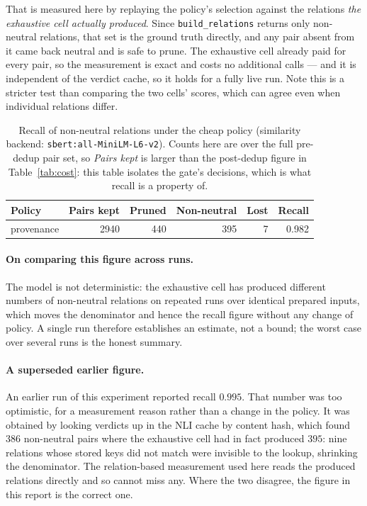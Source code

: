 \documentclass[11pt]{article}
\begin{document}
That is measured here by replaying the policy's selection against the relations \emph{the exhaustive cell actually produced}. Since \texttt{build\_relations} returns only non-neutral relations, that set is the ground truth directly, and any pair absent from it came back neutral and is safe to prune. The exhaustive cell already paid for every pair, so the measurement is exact and costs no additional calls --- and it is independent of the verdict cache, so it holds for a fully live run. Note this is a stricter test than comparing the two cells' scores, which can agree even when individual relations differ.

\begin{table}[htbp]
\centering
\begin{tabular}{lrrrrr}
\toprule
Policy & Pairs kept & Pruned & Non-neutral & Lost & Recall \\
\midrule
provenance & 2940 & 440 & 395 & 7 & 0.982 \\
\bottomrule
\end{tabular}
\caption{Recall of non-neutral relations under the cheap policy (similarity backend: \texttt{sbert:all-MiniLM-L6-v2}). Counts here are over the full pre-dedup pair set, so \emph{Pairs kept} is larger than the post-dedup figure in Table~\ref{tab:cost}: this table isolates the gate's decisions, which is what recall is a property of.}
\label{tab:recall}
\end{table}
\paragraph{On comparing this figure across runs.} The model is not deterministic: the exhaustive cell has produced different numbers of non-neutral relations on repeated runs over identical prepared inputs, which moves the denominator and hence the recall figure without any change of policy. A single run therefore establishes an estimate, not a bound; the worst case over several runs is the honest summary.

\paragraph{A superseded earlier figure.} An earlier run of this experiment reported recall $0.995$. That number was too optimistic, for a measurement reason rather than a change in the policy. It was obtained by looking verdicts up in the NLI cache by content hash, which found $386$ non-neutral pairs where the exhaustive cell had in fact produced $395$: nine relations whose stored keys did not match were invisible to the lookup, shrinking the denominator. The relation-based measurement used here reads the produced relations directly and so cannot miss any. Where the two disagree, the figure in this report is the correct one.
\end{document}

